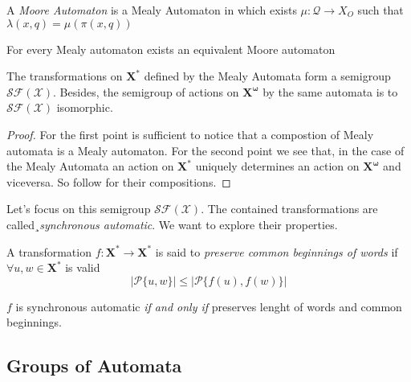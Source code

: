 \documentclass[mat1]{fmfdeloTS}
\newcommand{\fslovar}{\mathbf{X^*}}
\newcommand{\infslovar}{\mathbf{X^\omega}}
\newcommand{\QQ}{\mathcal{Q}}
\begin{document}
\begin{definition}
A \textit{Moore Automaton} is a Mealy Automaton in which exists $\mu:\QQ\longrightarrow X_O$ such that $\lambda(x,q)=\mu(\pi(x,q))$
\end{definition}
\begin{proposition}
For every Mealy automaton exists an equivalent Moore automaton
\end{proposition}

\begin{proposition}
The transformations on $\fslovar$ defined by the Mealy Automata form a semigroup $\mathcal{SF(X)}$. Besides, the semigroup of actions on $\infslovar$ by the same automata is to $\mathcal{SF(X)}$ isomorphic.
\end{proposition}
\begin{proof}
For the first point is sufficient to notice that a compostion of Mealy automata is a Mealy automaton. For the second point we see that, in the case of the Mealy Automata an action on $\fslovar$ uniquely determines an action on $\infslovar$ and viceversa. So follow for their compositions.
\end{proof}

Let's focus on this semigroup $\mathcal{SF(X)}$. The contained transformations are called¸\textit{synchronous automatic}. We want to explore their properties.
\begin{definition}
A transformation $f:\fslovar\longrightarrow\fslovar$ is said to \textit{preserve common beginnings of words} if $\forall u,w\in\fslovar$ is valid$$|\mathcal{P}\{u,w\}|\leq|\mathcal{P}\{f(u),f(w)\}|$$
\end{definition}
\begin{proposition}
$f$ is synchronous automatic \textit{if and only if} preserves lenght of words and common beginnings.
\end{proposition}



\bigskip
\bigskip
\bigskip
\subsection{Groups of Automata}








\end{document}
